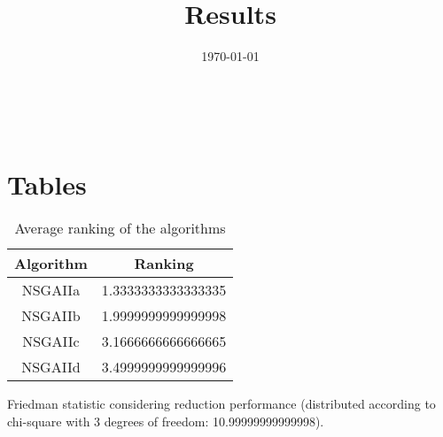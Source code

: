\documentclass{article}
\title{Results}
\author{}
\date{\today}
\begin{document}
\oddsidemargin 0in \topmargin 0in\maketitle
\
\section{Tables}
\begin{table}[!htp]
\centering
\caption{Average ranking of the algorithms}
\begin{tabular}{c|c}
Algorithm&Ranking\\
\hline
NSGAIIa&1.3333333333333335\\
NSGAIIb&1.9999999999999998\\
NSGAIIc&3.1666666666666665\\
NSGAIId&3.4999999999999996\\
\end{tabular}
\end{table}


Friedman statistic considering reduction performance (distributed according to chi-square with 3 degrees of freedom: 10.99999999999998).
\end{document}
